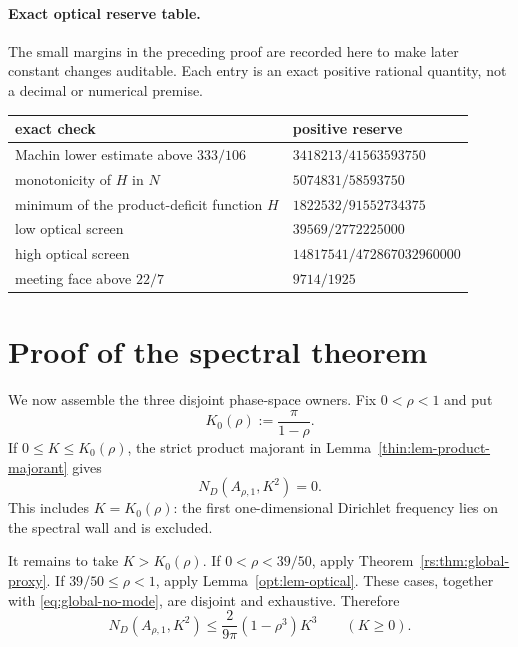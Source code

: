\documentclass[11pt]{article}
\numberwithin{equation}{section}
\theoremstyle{definition}
\theoremstyle{remark}
\begin{document}
\paragraph{Exact optical reserve table.}
The small margins in the preceding proof are recorded here to make later
constant changes auditable.  Each entry is an exact positive rational
quantity, not a decimal or numerical premise.
\begin{center}
\small
\begin{tabular}{@{}ll@{}}
\toprule
exact check&positive reserve\\
\midrule
Machin lower estimate above \(333/106\)&
\(3418213/41563593750\)\\
monotonicity of \(H\) in \(N\)&\(5074831/58593750\)\\
minimum of the product-deficit function \(H\)&
\(1822532/91552734375\)\\
low optical screen&\(39569/2772225000\)\\
high optical screen&\(14817541/472867032960000\)\\
meeting face above \(22/7\)&\(9714/1925\)\\
\bottomrule
\end{tabular}
\end{center}

\section{Proof of the spectral theorem}

We now assemble the three disjoint phase-space owners.  Fix
\(0<\rho<1\) and put
\[
 K_0(\rho):=\frac{\pi}{1-\rho}.
\]
If \(0\leq K\leq K_0(\rho)\), the strict product majorant in
Lemma~\ref{thin:lem-product-majorant} gives
\begin{equation}
 N_D(A_{\rho,1},K^2)=0.
 \label{eq:global-no-mode}
\end{equation}
This includes \(K=K_0(\rho)\): the first one-dimensional Dirichlet
frequency lies on the spectral wall and is excluded.

It remains to take \(K>K_0(\rho)\).  If
\(0<\rho<39/50\), apply
Theorem~\ref{rs:thm:global-proxy}.  If
\(39/50\leq\rho<1\), apply Lemma~\ref{opt:lem-optical}.  These cases,
together with \eqref{eq:global-no-mode}, are disjoint and exhaustive.
Therefore
\begin{equation}
  N_D(A_{\rho,1},K^2)
  \le\frac{2}{9\pi}(1-\rho^3)K^3
  \qquad(K\ge0).
  \label{eq:unit-shell-theorem}
\end{equation}
\end{document}
